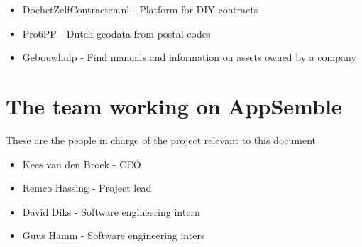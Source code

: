 \begin{itemize}
	\item DoehetZelfContracten.nl - Platform for DIY contracts
	\item Pro6PP - Dutch geodata from postal codes
	\item Gebouwhulp - Find manuals and information on assets owned by a company
\end{itemize}

\section{The team working on AppSemble}

These are the people in charge of the project relevant to this document

\begin{itemize}
	\item Kees van den Broek	- CEO
	\item Remco Hassing			- Project lead
	\item David Diks			- Software engineering intern
	\item Guus Hamm				- Software engineering inters
\end{itemize}